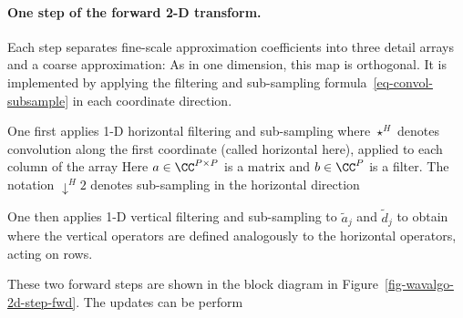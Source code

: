 
  
\paragraph{One step of the forward 2-D transform.}

Each step separates fine-scale approximation coefficients into three detail arrays and a coarse approximation:
As in one dimension, this map is orthogonal. It is implemented by applying the filtering and sub-sampling formula~\eqref{eq-convol-subsample} in each coordinate direction.

One first applies 1-D horizontal filtering and sub-sampling
where $\star^H$ denotes convolution along the first coordinate (called horizontal here), applied to each column of the array
Here $a\in\CC^{P\times P}$ is a matrix and $b\in\CC^P$ is a filter. The notation $\downarrow^H 2$ denotes sub-sampling in the horizontal direction

One then applies 1-D vertical filtering and sub-sampling to $\tilde a_j$ and $\tilde d_j$ to obtain
where the vertical operators are defined analogously to the horizontal operators, acting on rows.



These two forward steps are shown in the block diagram in Figure~\ref{fig-wavalgo-2d-step-fwd}.
The updates can be perform